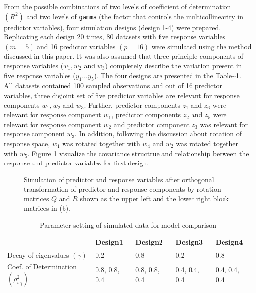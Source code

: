\documentclass[3p,times,12pt,authoryear]{elsarticle}
\theoremstyle{definition}
\theoremstyle{definition}
\theoremstyle{remark}
\begin{document}
From the possible combinations of two levels of coefficient of
determination \((R^2)\) and two levels of \texttt{gamma} (the factor
that controls the multicollinearity in predictor variables), four
simulation designs (design 1-4) were prepared. Replicating each design
20 times, 80 datasets with five response variables \((m=5)\) and 16
predictor variables \((p = 16)\) were simulated using the method
discussed in this paper. It was also assumed that three principle
components of response variables (\(w_1, w_2\) and \(w_3\)) completely
describe the variation present in five response variables
(\(y_1 \ldots y_5\)). The four designs are presented in the
Table\textasciitilde{}\ref{tab:parameter-settings}. All datasets
contained 100 sampled observations and out of 16 predictor variables,
three disjoint set of five predictor variables are relevant for response
components \(w_1, w_2\) and \(w_3\). Further, predictor components
\(z_1\) and \(z_6\) were relevant for response component \(w_1\),
predictor components \(z_2\) and \(z_5\) were relevant for response
component \(w_2\) and predictor component \(z_3\) was relevant for
response component \(w_3\). In addition, following the discussion about
\protect\hyperlink{rotation-of-response-space}{rotation of response
space}, \(w_1\) was rotated together with \(w_4\) and \(w_2\) was
rotated together with \(w_5\). Figure \ref{fig:cov-plot-print-1}
visualize the covariance structrue and relationship between the response
and predictor variables for first design.

\begin{figure}[!htb]
\caption{Simulation of predictor and response variables after orthogonal transformation of predictor and response components by rotation matrices $Q$ and $R$ shown as the upper left and the lower right block matrices in (b).}\label{fig:cov-plot-print-1}
\end{figure}

\begin{table}[!h]

\caption{\label{tab:parameter-settings}Parameter setting of simulated data for model comparison}
\centering
\begin{tabular}[t]{p{}p{}p{}p{}p{}}
\toprule
  & Design1 & Design2 & Design3 & Design4\\
\midrule
Decay of eigenvalues $(\gamma)$ & 0.2 & 0.8 & 0.2 & 0.8\\
Coef. of Determination $(\rho^2_{w_j})$ & 0.8, 0.8, 0.4 & 0.8, 0.8, 0.4 & 0.4, 0.4, 0.4 & 0.4, 0.4, 0.4\\
\bottomrule
\end{tabular}
\end{table}
\end{document}
